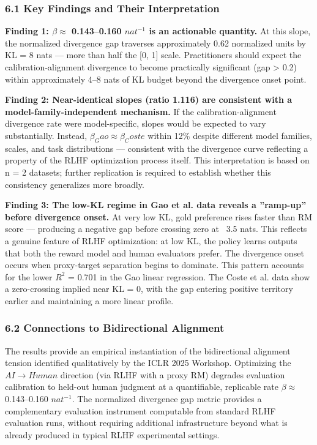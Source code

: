 
\subsubsection{6.1 Key Findings and Their Interpretation}

\textbf{Finding 1: $\beta \approx$ 0.143--0.160 $nat^{-1}$ is an actionable quantity.} At this slope, the normalized divergence gap traverses approximately 0.62 normalized units by KL = 8 nats --- more than half the [0, 1] scale. Practitioners should expect the calibration-alignment divergence to become practically significant (gap > 0.2) within approximately 4--8 nats of KL budget beyond the divergence onset point.

\textbf{Finding 2: Near-identical slopes (ratio 1.116) are consistent with a model-family-independent mechanism.} If the calibration-alignment divergence rate were model-specific, slopes would be expected to vary substantially. Instead, $\beta _Gao \approx \beta _Coste$ within 12\% despite different model families, scales, and task distributions --- consistent with the divergence curve reflecting a property of the RLHF optimization process itself. This interpretation is based on n = 2 datasets; further replication is required to establish whether this consistency generalizes more broadly.

\textbf{Finding 3: The low-KL regime in Gao et al. data reveals a ''ramp-up'' before divergence onset.} At very low KL, gold preference rises faster than RM score --- producing a negative gap before crossing zero at ~3.5 nats. This reflects a genuine feature of RLHF optimization: at low KL, the policy learns outputs that both the reward model and human evaluators prefer. The divergence onset occurs when proxy-target separation begins to dominate. This pattern accounts for the lower $R^2$ = 0.701 in the Gao linear regression. The Coste et al. data show a zero-crossing implied near KL = 0, with the gap entering positive territory earlier and maintaining a more linear profile.

\subsubsection{6.2 Connections to Bidirectional Alignment}

The results provide an empirical instantiation of the bidirectional alignment tension identified qualitatively by the ICLR 2025 Workshop. Optimizing the $AI\rightarrow Human$ direction (via RLHF with a proxy RM) degrades evaluation calibration to held-out human judgment at a quantifiable, replicable rate $\beta \approx$ 0.143--0.160 $nat^{-1}$. The normalized divergence gap metric provides a complementary evaluation instrument computable from standard RLHF evaluation runs, without requiring additional infrastructure beyond what is already produced in typical RLHF experimental settings.

